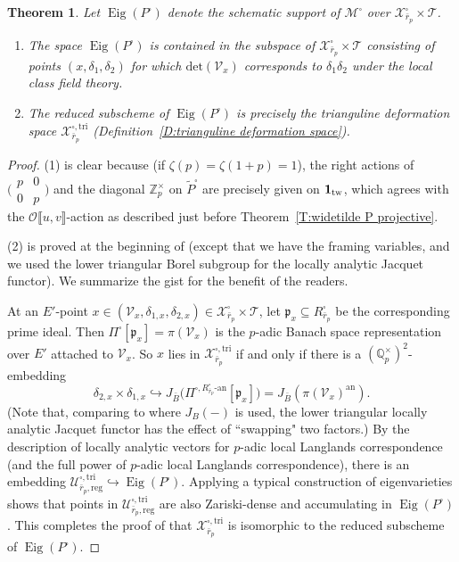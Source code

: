 \documentclass[12pt]{amsart}
\newtheorem{theorem}[subsection]{Theorem}
\theoremstyle{definition}
\numberwithin{equation}{subsection}
\def\calM{\mathcal{M}}
\def\calO{\mathcal{O}}
\def\calT{\mathcal{T}}
\def\calU{\mathcal{U}}
\def\calV{\mathcal{V}}
\def\calX{\mathcal{X}}
\def\gothp{\mathfrak{p}}
\def\QQ{\mathbb{Q}}
\def\ZZ{\mathbb{Z}}
\newcommand{\an}{\mathrm{an}}
\renewcommand{\det}{\mathrm{det}}
\newcommand{\tri}{\mathrm{tri}}
\newcommand{\reg}{\mathrm{reg}}
\DeclareMathOperator{\Eig}{Eig}
\newcommand{\Matrix}[4]{{\big(\begin{smallmatrix}#1&#2\\#3& #4\end{smallmatrix} \big)}}
\begin{document}
\begin{theorem}
\label{T:Xtri = X}
Let $\Eig(P^\square)$ denote the schematic support of $\calM^\square$ over $\calX_{\bar r_p}^\square \times \calT$. 
\begin{enumerate}
\item The space $\Eig(P^\square)$ is contained in the subspace of $\calX_{\bar r_p}^\square \times \calT$ consisting of points $(x,\delta_1,\delta_2)$ for which $\det(\calV_x)$ corresponds to $\delta_1\delta_2$ under the local class field theory. 
\item
The reduced subscheme of $\Eig(P^\square)$ is precisely the trianguline deformation space $\calX_{\bar r_p}^{\square, \tri}$ (Definition~\ref{D:trianguline deformation space}).
\end{enumerate} 
\end{theorem}
\begin{proof}
(1) is clear because (if $\zeta(p) = \zeta(1+p) =1$), the right actions of $\Matrix p00p$ and the diagonal $\ZZ_p^\times$ on $\widetilde P^\square$ are precisely given on ${\bf 1}_\mathrm{tw}$, which agrees with the $\calO\llbracket u,v\rrbracket$-action as described just before Theorem~\ref{T:widetilde P projective}.

(2) is proved at the beginning of \cite[Page~134]{breuil-ding} (except that we have the framing variables, and we used the lower triangular Borel subgroup for the locally analytic Jacquet functor). We summarize the gist for the benefit of the readers.

At an $E'$-point $x \in (\calV_x, \delta_{1,x}, \delta_{2,x}) \in \calX_{\bar r_p}^{\square} \times  \calT$, let $\gothp_x \subseteq R_{\bar r_p}^{\square}$ be the corresponding prime ideal. 
Then $\Pi^\square[\gothp_x] = \pi(\calV_x)$ is the $p$-adic Banach space representation over $E'$ attached to $\calV_x$.  So $x$ lies in $\calX_{\bar r_p}^{\square, \tri}$ if and only if there is a $(\QQ_p^\times)^2$-embedding 
$$\delta_{2,x} \times \delta_{1,x} \hookrightarrow J_{\bar B}\big( \Pi^{\square, R_{\bar r_p}^\square\textrm{-an}}[\gothp_x]\big) = J_{\bar B}(\pi(\calV_x)^\an).
$$
(Note that, comparing to \cite{breuil-ding} where $J_B(-)$ is used, the lower triangular locally analytic Jacquet functor has the effect of ``swapping" two factors.)
By the description of locally analytic vectors for $p$-adic local Langlands correspondence \cite{colmez, liu-xie-zhang} (and the full power of $p$-adic local Langlands correspondence), there is an embedding $\calU_{\bar r_p, \reg}^{\square, \tri} \hookrightarrow
\Eig(P^\square)$. Applying a typical construction of eigenvarieties shows that points in $\calU_{\bar r_p, \reg}^{\square, \tri}$ are also Zariski-dense and accumulating in $\Eig(P^\square)$. This completes the proof of that $\calX_{\bar r_p}^{\square, \tri}$ is isomorphic to the reduced subscheme of $\Eig(P^\square)$.
\end{proof}
\end{document}
